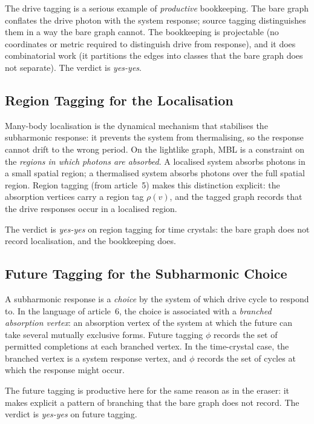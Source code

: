 \documentclass[11pt]{article}
\begin{document}
The drive tagging is a serious example of \emph{productive} bookkeeping. The bare graph conflates the drive photon with the system response; source tagging distinguishes them in a way the bare graph cannot. The bookkeeping is projectable (no coordinates or metric required to distinguish drive from response), and it does combinatorial work (it partitions the edges into classes that the bare graph does not separate). The verdict is \emph{yes-yes}.

\subsection{Region Tagging for the Localisation}

Many-body localisation is the dynamical mechanism that stabilises the subharmonic response: it prevents the system from thermalising, so the response cannot drift to the wrong period. On the lightlike graph, MBL is a constraint on the \emph{regions in which photons are absorbed}. A localised system absorbs photons in a small spatial region; a thermalised system absorbs photons over the full spatial region. Region tagging (from article~5) makes this distinction explicit: the absorption vertices carry a region tag $\rho(v)$, and the tagged graph records that the drive responses occur in a localised region.

The verdict is \emph{yes-yes} on region tagging for time crystals: the bare graph does not record localisation, and the bookkeeping does.

\subsection{Future Tagging for the Subharmonic Choice}

A subharmonic response is a \emph{choice} by the system of which drive cycle to respond to. In the language of article~6, the choice is associated with a \emph{branched absorption vertex}: an absorption vertex of the system at which the future can take several mutually exclusive forms. Future tagging $\phi$ records the set of permitted completions at each branched vertex. In the time-crystal case, the branched vertex is a system response vertex, and $\phi$ records the set of cycles at which the response might occur.

The future tagging is productive here for the same reason as in the eraser: it makes explicit a pattern of branching that the bare graph does not record. The verdict is \emph{yes-yes} on future tagging.
\end{document}
